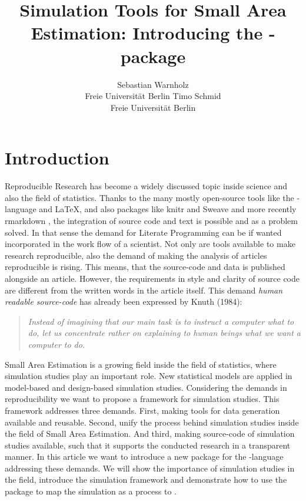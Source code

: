 \documentclass[article]{ajs}
\author{Sebastian Warnholz\\ Freie Universit\"at Berlin \And 
        Timo Schmid \\ Freie Universit\"at Berlin}
\title{Simulation Tools for Small Area Estimation: Introducing the \proglang{R}-package \proglang{saeSim}}
\begin{document}


\section{Introduction}
Reproducible Research has become a widely discussed topic inside science and also the field of statistics. Thanks to the many mostly open-source tools like the -language \cite{r14} and \LaTeX, and also packages like knitr \citep{yihui13} and Sweave \citep{leisch02} and more recently rmarkdown \citep{allaire14}, the integration of source code and text is possible and as a problem solved. In that sense the demand for Literate Programming can be if wanted incorporated in the work flow of a scientist. Not only are tools available to make research reproducible, also the demand of making the analysis of articles reproducible is rising. This means, that the source-code and data is published alongside an article. However, the requirements in style and clarity of source code are different from the written words in the article itself. This demand \textit{human readable source-code} has already been expressed by Knuth (1984): 
\begin{quote}
\textit{Instead of imagining that our main task is to instruct a computer what to do, let us concentrate rather on explaining to human beings what we want a computer to do.} \cite[p.99]{knuth92} 
\end{quote}
Small Area Estimation is a growing field inside the field of statistics, where simulation studies play an important role. New statistical models are applied in model-based and design-based simulation studies. Considering the demands in reproducibility we want to propose a framework for simulation studies. This framework addresses three demands. First, making tools for data generation available and reusable. Second, unify the process behind simulation studies inside the field of Small Area Estimation. And third, making source-code of simulation studies available, such that it supports the conducted research in a transparent manner.
In this article we want to introduce a new package for the -language addressing these demands. We will show the importance of simulation studies in the field, introduce the simulation framework and demonstrate how to use the package to map the simulation as a process to .
\end{document}
